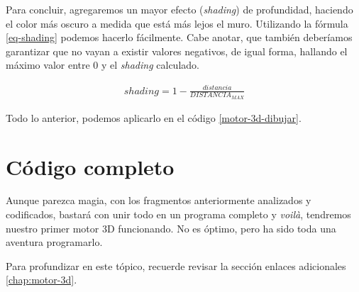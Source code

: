 Para concluir, agregaremos un mayor efecto (\emph{shading}) de profundidad, haciendo el color más oscuro a medida que está más lejos el muro. Utilizando la fórmula \ref{eq-shading} podemos hacerlo fácilmente. Cabe anotar, que también deberíamos garantizar que no vayan a existir valores negativos, de igual forma, hallando el máximo valor entre 0 y el \emph{shading} calculado.

\begin{equation}
\begin{aligned}
\label{eq-shading}
shading = 1 - \frac{distancia}{DISTANCIA_{MAX}}
\end{aligned}
\end{equation}

Todo lo anterior, podemos aplicarlo en el código \ref{motor-3d-dibujar}.



\section{Código completo}

Aunque parezca magia, con los fragmentos anteriormente analizados y codificados, bastará con unir todo en un programa completo y \emph{voilà}, tendremos nuestro primer motor 3D funcionando. No es óptimo, pero ha sido toda una aventura programarlo. 

Para profundizar en este tópico, recuerde revisar la sección enlaces adicionales \autoref{chap:motor-3d}.

\newpage


